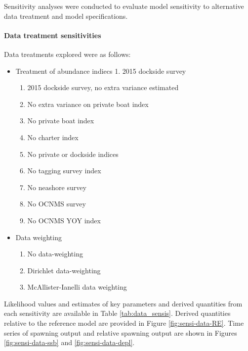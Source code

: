 \documentclass[11pt,
  english,
  letterpaper,
]{article}
\providecommand{\tightlist}{%
  \setlength{\itemsep}{0pt}\setlength{\parskip}{0pt}}
\providecommand{\tightlist}{%
  \setlength{\itemsep}{0pt}\setlength{\parskip}{0pt}}
\begin{document}
Sensitivity analyses were conducted to evaluate model sensitivity to alternative data treatment and model specifications.

\hypertarget{data-treatment-sensitivities}{%
\paragraph{Data treatment sensitivities}\label{data-treatment-sensitivities}}

Data treatments explored were as follows:

\begin{itemize}
\tightlist
\item
  Treatment of abundance indiecs 1. 2015 dockside survey

  \begin{enumerate}
  \def\labelenumi{\arabic{enumi}.}
  \setcounter{enumi}{1}
  \tightlist
  \item
    2015 dockside survey, no extra variance estimated
  \item
    No extra variance on private boat index
  \item
    No private boat index
  \item
    No charter index
  \item
    No private or dockside indices
  \item
    No tagging survey index
  \item
    No neashore survey
  \item
    No OCNMS survey
  \item
    No OCNMS YOY index
  \end{enumerate}
\item
  Data weighting

  \begin{enumerate}
  \def\labelenumi{\arabic{enumi}.}
  \setcounter{enumi}{10}
  \tightlist
  \item
    No data-weighting
  \item
    Dirichlet data-weighting
  \item
    McAllister-Ianelli data weighting
  \end{enumerate}
\end{itemize}

Likelihood values and estimates of key parameters and derived quantities from each sensitivity are available in Table \ref{tab:data_sensis}. Derived quantities relative to the reference model are provided in Figure \ref{fig:sensi-data-RE}. Time series of spawning output and relative spawning output are shown in Figures \ref{fig:sensi-data-ssb} and \ref{fig:sensi-data-depl}.
\end{document}
